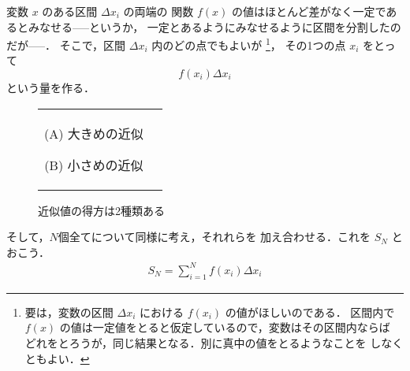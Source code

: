                 変数 $x$ のある区間 $\Delta x_{i}$ の両端の
                関数 $f(x)$ の値はほとんど差がなく一定であるとみなせる-----というか，
                一定とあるようにみなせるように区間を分割したのだが-----．
                そこで，区間 $\Delta x_{i}$ 内のどの点でもよいが
                    \footnote{
                        要は，変数の区間 $\Delta x_{i}$ における $f(x_{i})$ の値がほしいのである．
                        区間内で $f(x)$ の値は一定値をとると仮定しているので，変数はその区間内ならば
                        どれをとろうが，同じ結果となる．別に真中の値をとるようなことを
                        しなくともよい．
                    }，
                その1つの点 $x_{i}$ をとって
                    \begin{equation*}
                        f(x_{i})\Delta x_{i}
                    \end{equation*}
                という量を作る．
                            \begin{figure}[hbt]
                                \begin{tabular}{cc}
                                    \begin{minipage}{0.5\hsize}
                                    \begin{center}
                                        {INTEG_KINJI_L.pdf}

                                        (A) 大きめの近似
                                    \end{center}
                                    \end{minipage}
                                    \begin{minipage}{0.5\hsize}
                                    \begin{center}
                                        {INTEG_KINJI_S.pdf}

                                        (B) 小さめの近似
                                    \end{center}
                                    \end{minipage}
                                \end{tabular}
                                \caption{近似値の得方は2種類ある}
                                \label{fig:INTEG_KINJI}
                            \end{figure}

                そして，$N$個全てについて同様に考え，それれらを
                加え合わせる．これを $S_{N}$ とおこう．
                        \begin{align}\label{saouwa_menaseki}
                            S_{N}=\sum_{i=1}^{N} f(x_{i})\Delta x_{i}
                        \end{align}

